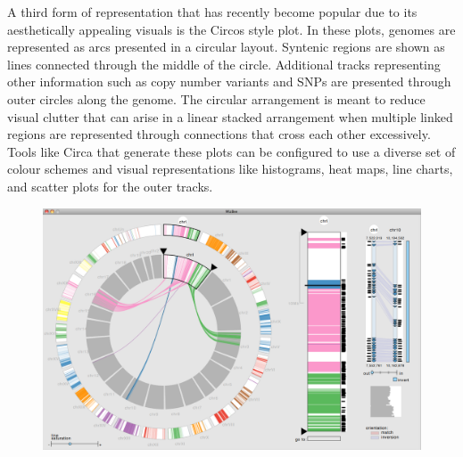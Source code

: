 A third form of representation that has recently become popular due to its aesthetically appealing visuals is the Circos style plot\cite{krzywinski2009circos}. In these plots, genomes are represented as arcs presented in a circular layout. Syntenic regions are shown as lines connected through the middle of the circle. Additional tracks representing other information such as copy number variants and SNPs are presented through outer circles along the genome. The circular arrangement is meant to reduce visual clutter that can arise in a linear stacked arrangement when multiple linked regions are represented through connections that cross each other excessively. Tools like Circa that generate these plots can be configured to use a diverse set of colour schemes and visual representations like histograms, heat maps, line charts, and scatter plots for the outer tracks\cite{circa}. 

\begin{figure}
  \centering
  \includegraphics[width=0.75\linewidth]{images/ch_2_mizbee.PNG}
  \label{fig:ch_2_mizbee}
\end{figure}


